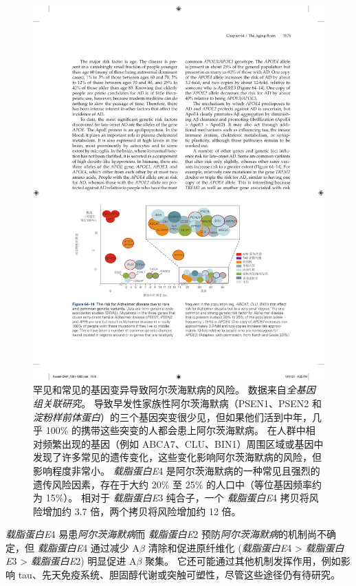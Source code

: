 \begin{figure}[htbp]
	\centering
	\includegraphics[width=1.0\linewidth]{chap64/fig_64_14}
	\caption{罕见和常见的基因变异导致阿尔茨海默病的风险。
		数据来自\textit{全基因组关联研究}。
		导致早发性家族性阿尔茨海默病（PSEN1、PSEN2 和 \textit{淀粉样前体蛋白}）的三个基因突变很少见，但如果他们活到中年，几乎 100\% 的携带这些突变的人都会患上阿尔茨海默病。
		在人群中相对频繁出现的基因（例如 ABCA7、CLU、BIN1）周围区域或基因中发现了许多常见的遗传变化，这些变化影响阿尔茨海默病的风险，但影响程度非常小。
		\textit{载脂蛋白E}4 是阿尔茨海默病的一种常见且强烈的遗传风险因素，存在于大约 20\% 至 25\% 的人口中（等位基因频率约为 15\%）。
		相对于 \textit{载脂蛋白E}3 纯合子，一个 \textit{载脂蛋白E}4 拷贝将风险增加约 3.7 倍，两个拷贝将风险增加约 12 倍\cite{karch2015alzheimer}。}
	\label{fig:64_14}
\end{figure}


\textit{载脂蛋白E}4 易患\textit{阿尔茨海默病}而 \textit{载脂蛋白E}2 预防\textit{阿尔茨海默病}的机制尚不确定，但 \textit{载脂蛋白E}4 通过减少 A$\beta$ 清除和促进原纤维化 (\textit{载脂蛋白E}4 > \textit{载脂蛋白E}3 > \textit{载脂蛋白E}2) 明显促进 A$\beta$ 聚集。
它还可能通过其他机制发挥作用，例如影响 tau、先天免疫系统、胆固醇代谢或突触可塑性，尽管这些途径仍有待研究。


